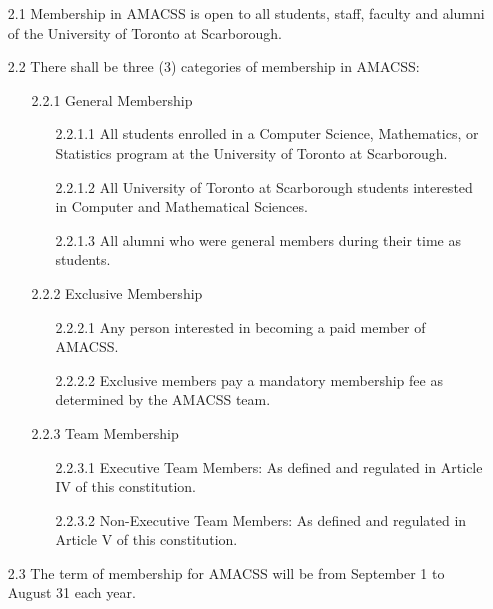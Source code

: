 \documentclass[12pt,a4paper]{article}
\begin{document}
\begin{enumerate}
\item[2.1] Membership in AMACSS is open to all students, staff, faculty and alumni of the University of Toronto at Scarborough.

\item[2.2] There shall be three (3) categories of membership in AMACSS:

\begin{enumerate}
\item[2.2.1] General Membership

\begin{enumerate}
\item[2.2.1.1] All students enrolled in a Computer Science, Mathematics, or Statistics program at the University of Toronto at Scarborough.

\item[2.2.1.2] All University of Toronto at Scarborough students interested in Computer and Mathematical Sciences.

\item[2.2.1.3] All alumni who were general members during their time as students.
\end{enumerate}

\item[2.2.2] Exclusive Membership

\begin{enumerate}
\item[2.2.2.1] Any person interested in becoming a paid member of AMACSS.

\item[2.2.2.2] Exclusive members pay a mandatory membership fee as determined by the AMACSS team.
\end{enumerate}

\item[2.2.3] Team Membership

\begin{enumerate}
\item[2.2.3.1] Executive Team Members: As defined and regulated in Article IV of this constitution.

\item[2.2.3.2] Non-Executive Team Members: As defined and regulated in Article V of this constitution.
\end{enumerate}
\end{enumerate}

\item[2.3] The term of membership for AMACSS will be from September 1 to August 31 each year.


\end{enumerate}
\end{document}
